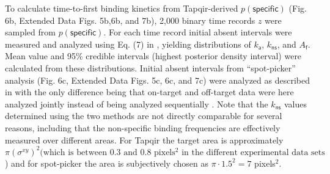 To calculate  time-to-first binding kinetics from Tapqir-derived $p(\mathsf{specific})$ (Fig. 6b, Extended Data Figs. 5b,6b, and 7b), 2,000 binary time records $z$ were sampled from $p(\mathsf{specific})$. For each time record initial absent intervals were measured and analyzed using Eq. (7) in \cite{Friedman2015-nx}, yielding distributions of $k_\mathsf{a}$, $k_\mathsf{ns}$, and $A_\mathsf{f}$. Mean value and 95\% credible intervals (highest posterior density interval) were calculated from these distributions. Initial absent intervals from ``spot-picker'' analysis (Fig. 6c, Extended Data Figs. 5c, 6c, and 7c) were analyzed as described in \cite{Friedman2015-nx} with the only difference being that on-target and off-target data were here analyzed jointly instead of being analyzed sequentially \cite{Friedman2015-nx}.  Note that the $k_\mathsf{ns}$ values determined using the two methods are not directly comparable for several reasons, including that the non-specific binding frequencies are effectively measured over different areas. For Tapqir the target area is approximately $ \pi \left( \sigma^{xy} \right) ^2 (\textrm{which is between } 0.3 \textrm{ and } 0.8 \textrm{ pixels$^2$ in the different experimental data sets}$) and for spot-picker the area is subjectively chosen as $\pi \cdot 1.5^2 = 7$ pixels$^2$.
